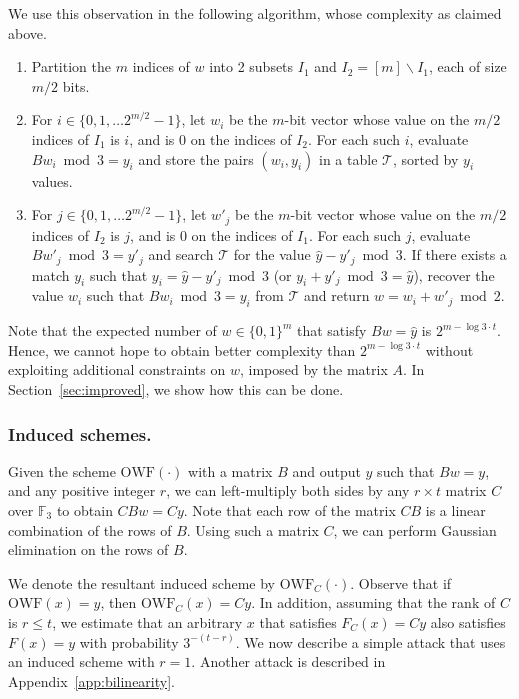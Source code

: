 \documentclass[orivec,envcountsect]{llncs}
\newcommand{\OWF}{\text{OWF}}
\begin{document}
We use this observation in the following algorithm, whose complexity as claimed above.
\begin{enumerate}
  \item Partition the $m$ indices of $w$ into 2 subsets $I_1$ and $I_2 = [m] \backslash I_1$, each of size $m/2$ bits.
  \item For $i \in \{0,1,\ldots 2^{m/2} - 1\}$, let $w_i$ be the $m$-bit vector whose value on the $m/2$ indices of $I_1$ is $i$, and is 0 on the indices of $I_2$. For each such $i$,
      evaluate $B w_i \bmod 3 = y_i$ and store the pairs $(w_i,y_i)$ in a table $\mathcal{T}$, sorted by $y_i$ values.
  \item For $j \in \{0,1,\ldots 2^{m/2} - 1\}$, let $w'_j$ be the $m$-bit vector whose value on the $m/2$ indices of $I_2$ is $j$, and is 0 on the indices of $I_1$. For each such $j$,
      evaluate $B w'_j \bmod 3 = y'_j$ and search $\mathcal{T}$ for the value $\hat{y} - y'_j \bmod 3$. If there exists a match $y_i$ such that $y_i = \hat{y} - y'_j \bmod 3$ (or $y_i + y'_j \bmod 3 = \hat{y}$), recover the value $w_i$ such that $B w_i \bmod 3 = y_i$ from $\mathcal{T}$
      and return $w = w_i + w'_j \bmod 2$.
\end{enumerate}

Note that the expected number of $w \in \{0,1\}^m$ that satisfy $B w = \hat{y}$ is $2^{m - \log 3 \cdot t}$. Hence, we cannot hope to obtain better complexity than $2^{m - \log 3 \cdot t}$ without exploiting additional constraints on $w$, imposed by the matrix $A$. In Section~\ref{sec:improved}, we show how this can be done.

\subsubsection{Induced schemes.}
Given the scheme $\OWF(\cdot)$ with a matrix $B$ and output $y$ such that $Bw = y$, and any positive integer $r$, we can left-multiply both sides by any $r \times t$ matrix $C$ over $\mathbb{F}_3$ to obtain $CBw = Cy$. Note that each row of the matrix $CB$ is a linear combination of the rows of $B$. Using such a matrix $C$, we can perform Gaussian elimination on the rows of $B$.

We denote the resultant induced scheme by $\OWF_C(\cdot)$. Observe that if $\OWF(x) = y$, then $\OWF_C(x) = Cy$.
In addition, assuming that the rank of $C$ is $r \leq t$, we estimate that an arbitrary $x$ that satisfies $F_C(x) = Cy$ also satisfies $F(x) = y$ with probability $3^{-(t - r)}$.
We now describe a simple attack that uses an induced scheme with $r=1$. Another attack is described in Appendix~\ref{app:bilinearity}.
\end{document}
